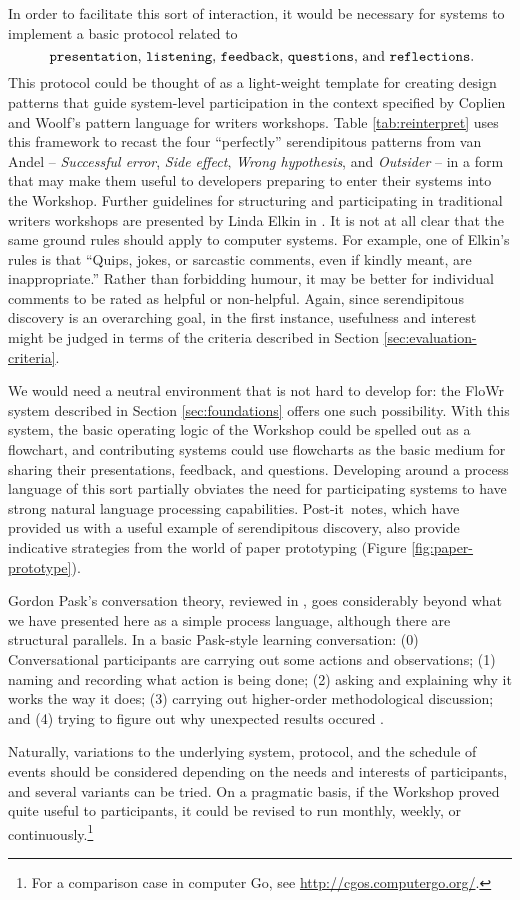 In order to facilitate this sort of interaction, it would be necessary
for systems to implement a basic protocol related to
\[
\text{
{\tt presentation}, {\tt listening}, {\tt
  feedback}, {\tt questions}, and {\tt
  reflections}.}
\]
This protocol could be thought of as a light-weight template for
creating design patterns that guide system-level participation in the
context specified by Coplien and Woolf's pattern language for writers
workshops.  Table \ref{tab:reinterpret} uses this framework to recast
the four ``perfectly'' serendipitous patterns from van Andel --
\emph{Successful error}, \emph{Side effect}, \emph{Wrong hypothesis},
and \emph{Outsider} -- in a form that may make them useful to
developers preparing to enter their systems into the Workshop.
%
Further guidelines for structuring and participating in traditional
writers workshops are presented by Linda Elkin in
\cite[pp. 201-203]{gabriel2002writer}.  It is not at all clear that
the same ground rules should apply to computer systems.  For example,
one of Elkin's rules is that ``Quips, jokes, or sarcastic comments,
even if kindly meant, are inappropriate.''  Rather than forbidding
humour, it may be better for individual comments to be rated as
helpful or non-helpful.  Again, since serendipitous discovery is an
overarching goal, in the first instance, usefulness and interest might
be judged in terms of the criteria described in Section
\ref{sec:evaluation-criteria}.

We would need a neutral environment that is not hard to develop for:
the {\sf FloWr} system described in Section \ref{sec:foundations}
offers one such possibility.  With this system, the basic operating
logic of the Workshop could be spelled out as a flowchart, and
contributing systems could use flowcharts as the basic medium for
sharing their presentations, feedback, and questions.  Developing
around a process language of this sort partially obviates the need for
participating systems to have strong natural language processing
capabilities.  
%
Post-it\texttrademark\ notes, which have provided us with a useful
example of serendipitous discovery, also provide indicative strategies
from the world of paper prototyping (Figure \ref{fig:paper-prototype}).

Gordon Pask's conversation theory, reviewed in
\cite{conversation-theory-review,boyd2004conversation}, goes
considerably beyond what we have presented here as a simple process
language, although there are structural parallels.  In a basic
Pask-style learning conversation: (0) Conversational participants are
carrying out some actions and observations; (1) naming and recording
what action is being done; (2) asking and explaining why it works the
way it does; (3) carrying out higher-order methodological discussion;
and (4) trying to figure out why unexpected results occured \cite[p. 190]{boyd2004conversation}.

Naturally, variations to the underlying system, protocol, and the
schedule of events should be considered depending on the needs and
interests of participants, and several variants can be tried.  On a
pragmatic basis, if the Workshop proved quite useful to participants,
it could be revised to run monthly, weekly, or
continuously.\footnote{For a comparison case in computer Go, see
  \url{http://cgos.computergo.org/}.}
